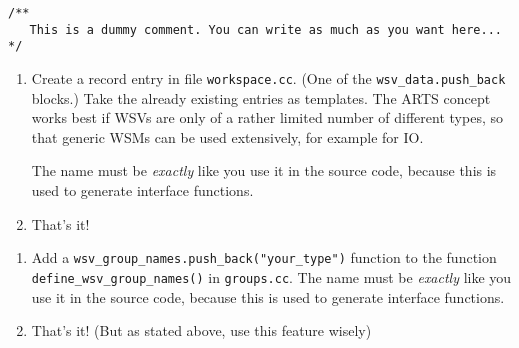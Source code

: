 \begin{verbatim}
/**
   This is a dummy comment. You can write as much as you want here... 
*/
\end{verbatim}




 \label{sec:development:extending}

\begin{enumerate}
\item Create a record entry in file \verb|workspace.cc|. (One of the
  \verb|wsv_data.push_back| blocks.) Take the already existing
  entries as templates. The ARTS concept works best if WSVs are only
  of a rather limited number of different types, so that generic WSMs
  can be used extensively, for example for IO.
      
  The name must be \emph{exactly} like you use it in the source code,
  because this is used to generate interface functions.
\item That's it!
\end{enumerate}


\begin{enumerate}
\item Add a \verb|wsv_group_names.push_back("your_type")| function to
  the function \verb|define_wsv_group_names()| in \verb|groups.cc|. The
  name must be \emph{exactly} like you use it in the source code,
  because this is used to generate interface functions.
\item That's it! (But as stated above, use this feature wisely)
\end{enumerate}



